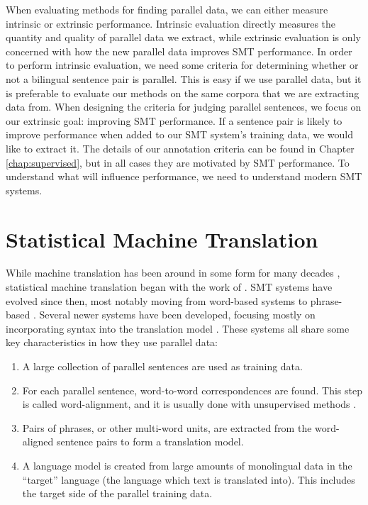 When evaluating methods for finding parallel data, we can either measure
intrinsic or extrinsic performance. Intrinsic evaluation directly measures the
quantity and quality of parallel data we extract, while extrinsic evaluation is
only concerned with how the new parallel data improves SMT performance.
In order to perform intrinsic evaluation, we need some criteria for determining whether or not a bilingual
sentence pair is parallel. This is easy if we use parallel data, but
it is preferable to evaluate our methods on the same corpora that we are
extracting data from. When designing the criteria for judging parallel
sentences, we focus on our extrinsic goal: improving SMT performance. If a sentence pair
is likely to improve performance when added to our SMT system's training data,
we would like to extract it. The details of our annotation criteria can be found
in Chapter \ref{chap:supervised}, but in all cases they are motivated by SMT
performance. To understand what will influence performance, we need to
understand modern SMT systems.

\section{Statistical Machine Translation}
While machine translation has been around in some form for many decades
\citep{Locke55}, statistical machine translation began with the work of
\citet{Brown88,Brown90,Brown93}. SMT systems have evolved since then, most notably moving from
word-based systems to phrase-based \citep{Koehn03}. Several newer systems have
been developed, focusing mostly on incorporating syntax into the translation
model \citep{Chiang05,Quirk05,Liu06,Galley06}. These systems all share some key
characteristics in how they use parallel data:

\begin{enumerate}
\item A large collection of parallel sentences are used as training data.
\item For each parallel sentence, word-to-word correspondences are found. This
step is called word-alignment, and it is usually done with unsupervised methods
\citep{Brown93,Vogel96}.
\item Pairs of phrases, or other multi-word units, are extracted from the
word-aligned sentence pairs to form a translation model.
\item A language model is created from large amounts of monolingual data in the
``target'' language (the language which text is translated into). This includes
the target side of the parallel training data.
\end{enumerate}

